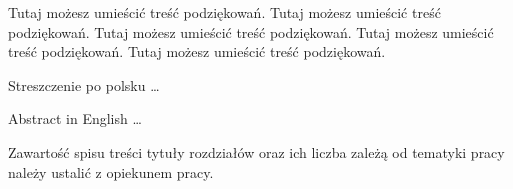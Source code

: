 \documentclass{agh-wi} %
\author{Imiona i nazwisko dyplomanta}
\begin{document}
\frontmatter %
\maketitle %
\cleardoublepage
\thispagestyle{empty}
\vspace*{\fill}
\begin{flushright}
    \em
    \begin{minipage}{0.75\textwidth}
        Tutaj możesz umieścić treść podziękowań.
        Tutaj możesz umieścić treść podziękowań.
        Tutaj możesz umieścić treść podziękowań.
        Tutaj możesz umieścić treść podziękowań.
        Tutaj możesz umieścić treść podziękowań.
    \end{minipage}
\end{flushright}
\begin{abstractPL}
    Streszczenie po polsku \ldots
\end{abstractPL}
\begin{abstractEN}
    Abstract in English \ldots
\end{abstractEN}
\tableofcontents   %
\begin{shaded}
    Zawartość spisu treści \pauza tytuły rozdziałów oraz ich liczba zależą od tematyki pracy \pauza należy ustalić z opiekunem pracy.
\end{shaded}
\listoffigures     %
\listoftables      %
\listofalgorithms  %
\lstlistoflistings %
\printnomenclature %
\mainmatter %




\appendix %

\backmatter %


\printbibliography  %
\end{document}
